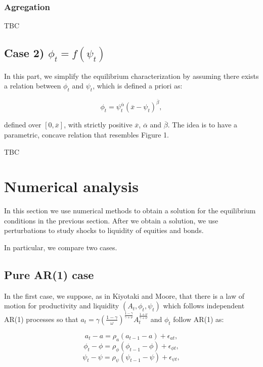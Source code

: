 \documentclass[12pt]{article}%
\begin{document}
\subsubsection{Agregation}
TBC
\subsection{Case 2) \exists  $\phi_t = f(\psi_t)$}
In this part, we simplify the equilibrium characterization by assuming there
exists a relation between $\phi_t$ and $\psi_t$, which is defined a priori as:

\begin{equation}
\phi_t=\psi_t^{\overline{\alpha}} (\overline{x}-\psi_t)^{\overline{\beta}},
\end{equation}

defined over $[0,\overline{x}]$, with strictly positive $\overline{x}$, $\overline{\alpha}$ and $\overline{\beta}$. The idea
is to have a parametric, concave relation that resembles Figure 1. 


TBC

\section{Numerical analysis}
In this section we use numerical methods to obtain a solution for the
equilibrium conditions in the previous section. After we obtain a solution, we
use perturbations to study shocks to liquidity of equities and bonds. 

In particular, we compare two cases.

\subsection{Pure AR(1) case}
In the first case, we
suppose, as in Kiyotaki and Moore, that there is a law of motion for
productivity and liquidity $(A_t, \phi_t, \psi_t)$ which follows independent AR(1)
processes so that $a_t = \gamma (\frac{1-\gamma}{\omega})^{\frac{1-\gamma}{\gamma + \nu}} A_t^{\frac{1+\nu}{\gamma+\nu}}
$ and $\phi_t$ follow AR(1) as:

\begin{equation}
a_t-a = \rho_a (a_{t-1}-a) + \epsilon_{at},
\end{equation}
\begin{equation}
\phi_t-\phi=\rho_{\phi} (\phi_{t-1}-\phi) + \epsilon_{\phi t},
\end{equation}
\begin{equation}
\psi_t-\psi=\rho_{\psi} (\psi_{t-1}-\psi) + \epsilon_{\psi t},
\end{equation}
\end{document}

